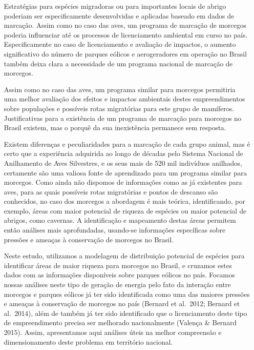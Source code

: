 \documentclass[
]{scrbook}
\begin{document}
Estratégias para espécies migradoras ou para importantes locais de abrigo poderiam ser especificamente desenvolvidas e aplicadas baseado em dados de marcação. Assim como no caso das aves, um programa de marcação de morcegos poderia influenciar até os processos de licenciamento ambiental em curso no país. Especificamente no caso de licenciamento e avaliação de impactos, o aumento significativo do número de parques eólicos e aerogeradores em operação no Brasil também deixa clara a necessidade de um programa nacional de marcação de morcegos.

Assim como no caso das aves, um programa similar para morcegos permitiria uma melhor avaliação dos efeitos e impactos ambientais destes empreendimentos sobre populações e possíveis rotas migratórias para este grupo de mamíferos. Justificativas para a existência de um programa de marcação para morcegos no Brasil existem, mas o porquê da sua inexistência permanece sem resposta.

Existem diferenças e peculiaridades para a marcação de cada grupo animal, mas é certo que a experiência adquirida ao longo de décadas pelo Sistema Nacional de Anilhamento de Aves Silvestres, e os seus mais de 520 mil indivíduos anilhados, certamente são uma valiosa fonte de aprendizado para um programa similar para morcegos. Como ainda não dispomos de informações como as já existentes para aves, para as quais possíveis rotas migratórias e pontos de descanso são conhecidos, no caso dos morcegos a abordagem é mais teórica, identificando, por exemplo, áreas com maior potencial de riqueza de espécies ou maior potencial de abrigos, como cavernas. A identificação e mapeamento destas áreas permitem então análises mais aprofundadas, usando-se informações específicas sobre pressões e ameaças à conservação de morcegos no Brasil.

Neste estudo, utilizamos a modelagem de distribuição potencial de espécies para identificar áreas de maior riqueza para morcegos no Brasil, e cruzamos estes dados com as informações disponíveis sobre parques eólicos no país. Focamos nossas análises neste tipo de geração de energia pelo fato da interação entre morcegos e parques eólicos já ter sido identificada como uma das maiores pressões e ameaças à conservação de morcegos no país (Bernard et al.~2012; Bernard et al.~2014), além de também já ter sido identificado que o licenciamento deste tipo de empreendimento precisa ser melhorado nacionalmente (Valença \& Bernard 2015). Assim, apresentamos aqui análises úteis na melhor compreensão e dimensionamento deste problema em território nacional.
\end{document}
